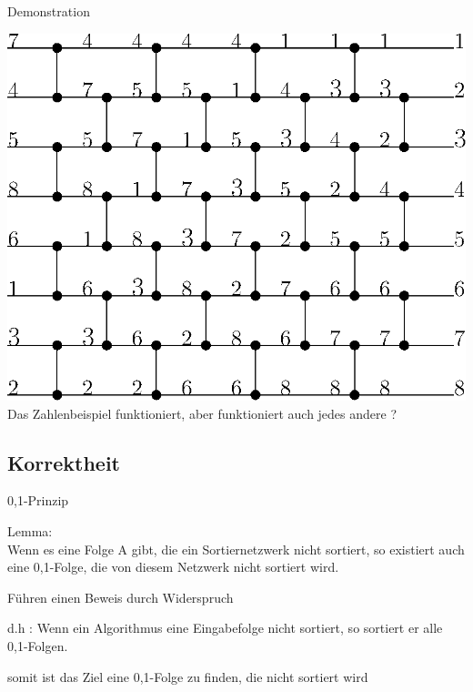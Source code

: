\documentclass[ucs,9pt]{beamer}
\begin{document}
\begin{frame}{Demonstration}
\begin{center}
   \includegraphics[scale=0.8]{bild2beispiel.eps}\\
 {Das Zahlenbeispiel funktioniert, aber funktioniert auch jedes andere ?}\\
  \end{center}

\end{frame}

\subsection{Korrektheit}
\begin{frame}{0,1-Prinzip}
\vfill
{} {
\begin{center}
\begin{minipage}[c]{9cm}
Lemma: \\
Wenn es eine Folge A gibt, die ein Sor\-tier\-netz\-werk nicht sortiert, so existiert auch eine 0,1-Folge, die von diesem Netzwerk nicht sortiert wird.
\end{minipage}
\vfill
\end{center}
}
\begin{itemize}
 { \item Führen einen Beweis durch Widerspruch \\}
 { \item d.h : Wenn ein Algorithmus eine Eingabefolge nicht sortiert, so sortiert er alle 0,1-Folgen. }
 { \item somit ist das Ziel eine 0,1-Folge zu finden, die nicht sortiert wird}
\end{itemize} 
\end{frame}
\end{document}
